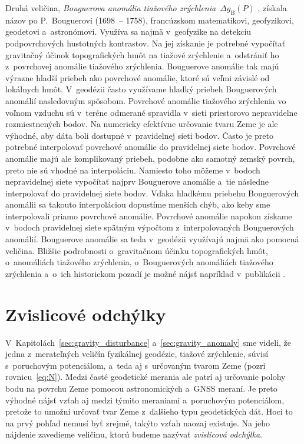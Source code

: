\documentclass[a4paper, 12pt]{book}
\begin{document}
Druhá veličina, \emph{Bouguerova anomália tiažového zrýchlenia}~$\Delta 
g_{\mathrm{B}}(P)$ \parencite{MoritzPhysicalGeodesy}, získala názov po 
P.~Bouguerovi (1698~-- 1758), francúzskom matematikovi, geofyzikovi, geodetovi 
a~astronómovi.  Využíva sa najmä v~geofyzike na detekciu podpovrchových 
hustotných kontrastov.  Na jej získanie je potrebné vypočítať gravitačný účinok 
topografických hmôt na tiažové zrýchlenie a~odstrániť ho z~povrchovej anomálie 
tiažového zrýchlenia.  Bouguerove anomálie tak majú výrazne hladší priebeh ako 
povrchové anomálie, ktoré sú veľmi závislé od lokálnych hmôt.  V~geodézii často 
využívame hladký priebeh Bouguerových anomálií nasledovným spôsobom.  Povrchové 
anomálie tiažového zrýchlenia vo voľnom vzduchu sú v~teréne odmerané spravidla 
v~sieti priestorovo nepravidelne rozmiestnených bodov.  Na numericky efektívne 
určovanie tvaru Zeme je ale výhodné, aby dáta boli dostupné v~pravidelnej sieti 
bodov.  Často je preto potrebné interpolovať povrchové anomálie do pravidelnej 
siete bodov.  Povrchové anomálie majú ale komplikovaný priebeh, podobne ako 
samotný zemský povrch, preto nie sú vhodné na interpoláciu.  Namiesto toho 
môžeme v~bodoch nepravidelnej siete vypočítať najprv Bouguerove anomálie a~tie 
následne interpolovať do pravidelnej siete bodov.  Vďaka hladkému priebehu 
Bouguerových anomálii sa takouto interpoláciou dopustíme menších chýb, ako keby 
sme interpolovali priamo povrchové anomálie.  Povrchové anomálie napokon 
získame v~bodoch pravidelnej siete spätným výpočtom z~interpolovaných 
Bouguerových anomálií.  Bouguerove anomálie sa teda v~geodézii využívajú najmä 
ako pomocná veličina.  Bližšie podrobnosti o~gravitačnom účinku topografických 
hmôt, o~anomáliách tiažového zrýchlenia, o~Bouguerových anomáliách tiažového 
zrýchlenia a~o~ich historickom pozadí je možné nájsť napríklad v~publikácii 
\textcite{Vajda2020}.





\section{Zvislicové odchýlky}
\label{sec:deflections}

V~Kapitolách~\ref{sec:gravity_disturbance} a~\ref{sec:gravity_anomaly} sme 
videli, že jedna z~merateľných veličín fyzikálnej geodézie, tiažové zrýchlenie, 
súvisí s~poruchovým potenciálom, a~teda aj s~určovaným tvarom Zeme (pozri 
rovnicu~\ref{eq:N}).  Medzi časté geodetické merania ale patrí aj určovanie 
polohy bodu na povrchu Zeme pomocou astronomických a~GNSS meraní.  Je preto 
výhodné nájsť vzťah aj medzi týmito meraniami a~poruchovým potenciálom, pretože 
to umožní určovať tvar Zeme z~ďalšieho typu geodetických dát.  Hoci to na prvý 
pohľad nemusí byť zrejmé, takýto vzťah naozaj existuje.  Na jeho nájdenie 
zavedieme veličinu, ktorú budeme nazývať \emph{zvislicová odchýlka}.
\end{document}
